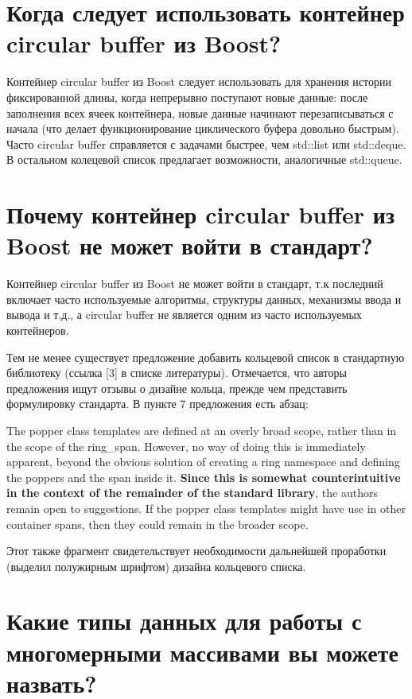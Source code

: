 \documentclass[a4paper,12pt]{article}	%
\begin{document}
\section{Когда следует использовать контейнер circular buffer из Boost?}

	Контейнер circular buffer из Boost следует использовать для хранения истории фиксированной длины, когда непрерывно поступают новые данные: после заполнения всех ячеек контейнера, новые данные начинают перезаписываться с начала (что делает функционирование циклического буфера довольно быстрым). Часто circular buffer справляется с задачами быстрее, чем std::list или std::deque. В остальном колецевой список предлагает возможности, аналогичные std::queue.

\section{Почему контейнер circular buffer из Boost не может войти в стандарт?}

	Контейнер circular buffer из Boost не может войти в стандарт, т.к последний включает часто используемые алгоритмы, структуры данных, механизмы ввода и вывода и т.д., а circular buffer не является одним из часто используемых контейнеров.
	
	Тем не менее существует предложение добавить кольцевой список в стандартную библиотеку (ссылка [3] в списке литературы). Отмечается, что авторы предложения ищут отзывы о дизайне кольца, прежде чем представить формулировку стандарта. В пункте 7 предложения есть абзац:
	\begin{displayquote}
		The popper class templates are defined at an overly broad scope, rather than in the scope of the ring\_span.  However, no way of doing this is immediately apparent, beyond the obvious solution of creating a ring namespace and defining the poppers and the span inside it.  \textbf{Since this is somewhat counterintuitive in the context of the remainder of the standard library}, the authors remain open to suggestions.  If the popper class templates might have use in other container spans, then they could remain in the broader scope.
	 \end{displayquote}	 

	Этот также фрагмент свидетельствует необходимости дальнейшей проработки (выделил полужирным шрифтом) дизайна кольцевого списка.

\section{Какие типы данных для работы с многомерными массивами вы можете назвать?}
\end{document}
